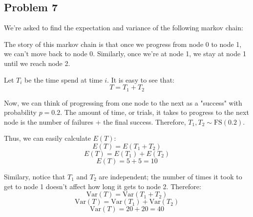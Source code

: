 \documentclass{article}
\begin{document}
\subsection{Problem 7}
We're asked to find the expectation and variance of the following markov chain:

\begin{figure}[!htb]
    \centering
{}
\end{figure}

The story of this markov chain is that once we progress from node 0 to node 1, we can't move back to node 0. Similarly, once we're at node 1, we stay at node 1 until we reach node 2.

Let $T_{i}$ be the time spend at time $i$. It is easy to see that:
$$T = T_{1} + T_{2}$$

Now, we can think of progressing from one node to the next as a "success" with probability $p = 0.2$. The amount of time, or trials, it takes to progress to the next node is the number of failures + the final success. Therefore, $T_{1}, T_{2} \sim \text{FS}(0.2)$.

Thus, we can easily calculate $E(T)$:
$$E(T) = E(T_{1} + T_{2})$$
$$E(T) = E(T_{1}) + E(T_{2})$$
$$E(T) = 5 + 5 = 10$$

Similary, notice that $T_{1}$ and $T_{2}$ are independent; the number of times it took to get to node 1 doesn't affect how long it gets to node 2. Therefore:
$$\text{Var}(T) = \text{Var}(T_{1} + T_{2})$$
$$\text{Var}(T) = \text{Var}(T_{1}) + \text{Var}(T_{2})$$
$$\text{Var}(T) = 20 + 20 = 40$$


\end{document}
